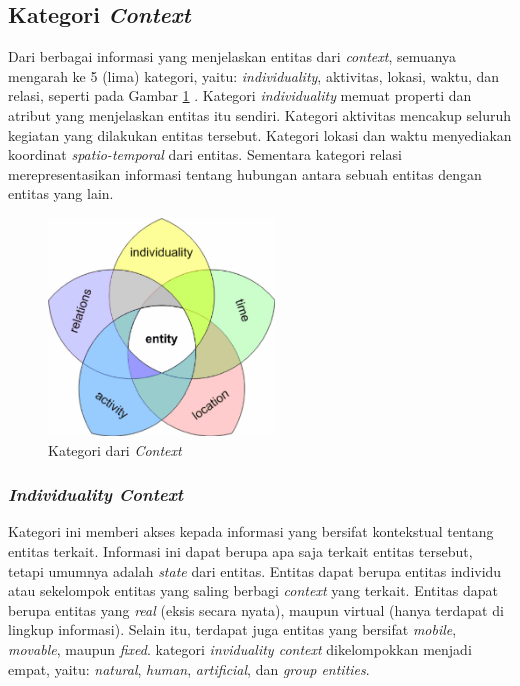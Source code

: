 \subsection{Kategori \textit{Context}}
\label{ssec:context-category}
Dari berbagai informasi yang menjelaskan entitas dari \textit{context}, semuanya mengarah ke 5 (lima) kategori, yaitu: \textit{individuality}, aktivitas, lokasi, waktu, dan relasi, seperti pada Gambar \ref{fig:context-categories} \citep{zimmermann_operational_2007}. Kategori \textit{individuality} memuat properti dan atribut yang menjelaskan entitas itu sendiri. Kategori aktivitas mencakup seluruh kegiatan yang dilakukan entitas tersebut. Kategori lokasi dan waktu menyediakan koordinat \textit{spatio-temporal} dari entitas. Sementara kategori relasi merepresentasikan informasi tentang hubungan antara sebuah entitas dengan entitas yang lain.


\begin{figure}[h]
	\centering
	\includegraphics[width=6cm]{Resources/Images/context-categories}
	\caption{Kategori dari \textit{Context}}
	\label{fig:context-categories}
\end{figure}


\subsubsection{\textit{Individuality Context}}
\label{sssec:individuality-context}
Kategori ini memberi akses kepada informasi yang bersifat kontekstual tentang entitas terkait. Informasi ini dapat berupa apa saja terkait entitas tersebut, tetapi umumnya adalah \textit{state} dari entitas. Entitas dapat berupa entitas individu atau sekelompok entitas yang saling berbagi \textit{context} yang terkait. Entitas dapat berupa entitas yang \textit{real} (eksis secara nyata), maupun virtual (hanya terdapat di lingkup informasi). Selain itu, terdapat juga entitas yang bersifat \textit{mobile}, \textit{movable}, maupun \textit{fixed}. kategori \textit{inviduality context} dikelompokkan menjadi empat, yaitu: \textit{natural}, \textit{human}, \textit{artificial}, dan \textit{group entities}.


